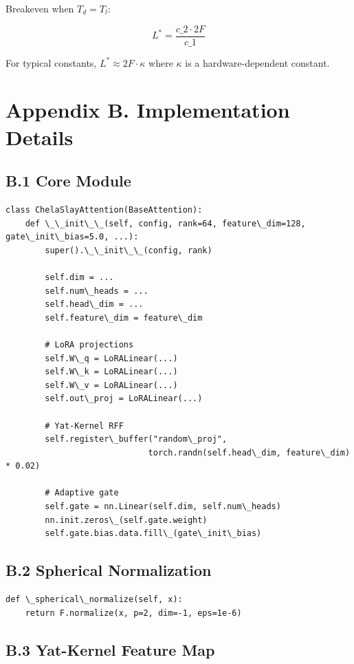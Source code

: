 Breakeven when $T_d = T_l$:

\[
L^* = \frac{c\_2 \cdot 2F}{c\_1}
\]

For typical constants, $L^* \approx 2F \cdot \kappa$ where $\kappa$ is a 
hardware-dependent constant.



\section{Appendix B. Implementation Details}

\subsection{B.1 Core Module}

\begin{lstlisting}
class ChelaSlayAttention(BaseAttention):
    def \_\_init\_\_(self, config, rank=64, feature\_dim=128, gate\_init\_bias=5.0, ...):
        super().\_\_init\_\_(config, rank)
        
        self.dim = ...
        self.num\_heads = ...
        self.head\_dim = ...
        self.feature\_dim = feature\_dim
        
        # LoRA projections
        self.W\_q = LoRALinear(...)
        self.W\_k = LoRALinear(...)
        self.W\_v = LoRALinear(...)
        self.out\_proj = LoRALinear(...)
        
        # Yat-Kernel RFF
        self.register\_buffer("random\_proj", 
                             torch.randn(self.head\_dim, feature\_dim) * 0.02)
        
        # Adaptive gate
        self.gate = nn.Linear(self.dim, self.num\_heads)
        nn.init.zeros\_(self.gate.weight)
        self.gate.bias.data.fill\_(gate\_init\_bias)
\end{lstlisting}

\subsection{B.2 Spherical Normalization}

\begin{lstlisting}
def \_spherical\_normalize(self, x):
    return F.normalize(x, p=2, dim=-1, eps=1e-6)
\end{lstlisting}

\subsection{B.3 Yat-Kernel Feature Map}

